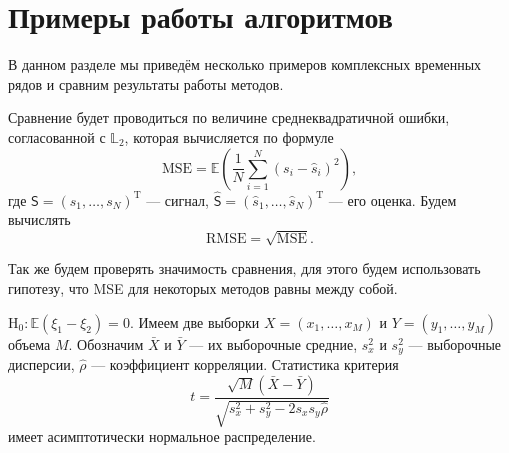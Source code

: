 \documentclass[specialist,
               substylefile = spbu.rtx,
               subf,href,colorlinks=true, 12pt]{disser}
\newcommand{\tX}[1]{\mathsf{#1}}
\begin{document}
%
%

\chapter{Примеры работы алгоритмов}
В данном разделе мы приведём несколько примеров комплексных временных рядов и сравним результаты работы методов.

Сравнение будет проводиться по величине среднеквадратичной ошибки, согласованной с $\mathbb{L}_2$, которая вычисляется по формуле
\begin{equation}\label{MSE}
	\text{MSE} = \mathbb{E} \left(\frac{1}{N} \sum \limits_{i=1}^{N}(s_i - \hat s_i )^2 \right),
\end{equation}
где $\tX{S}=(s_1,\ldots,s_N)^\mathrm{T}$ --- сигнал, $\hat{\tX{S}}=(\hat{s}_1,\ldots,\hat{s}_N)^\mathrm{T}$ --- его оценка.
Будем вычислять
\begin{equation*}
	\text{RMSE} = \sqrt{\textrm{MSE}}.
\end{equation*}

Так же будем проверять значимость сравнения, для этого будем использовать гипотезу, что MSE для некоторых методов равны между собой.

$\mathrm{H}_0: \mathbb{E}(\xi_1-\xi_2)=0$.
Имеем две выборки $X=(x_1,\ldots,x_M)$ и $Y=(y_1,\ldots,y_M)$ объема $M$. Обозначим $\bar{X}$ и $\bar{Y}$ --- их выборочные средние, $s_x^2$ и $s_y^2$ --- выборочные дисперсии, $\hat\rho$ --- коэффициент корреляции. 
Статистика критерия 
\begin{equation*}
	t = \frac{\sqrt{M}(\bar{X}-\bar{Y})}{\sqrt{s_x^2+s_y^2-2s_xs_y\hat\rho}}
\end{equation*}
имеет асимптотически нормальное распределение.
\end{document}
